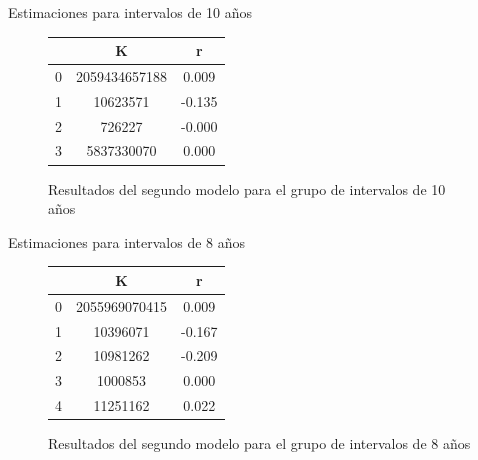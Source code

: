 \documentclass{beamer}
\begin{document}
\begin{frame}{Estimaciones para intervalos de 10 años}
    \begin{figure}[h!]%
        \begin{center}
            \begin{tabular}{|c|c|c|} \hline
                         & K 			& r 		\\ \hline
                0		 & 2059434657188& 0.009		\\ \hline
                1		 &10623571		& -0.135	\\ \hline
                2		 & 726227		& -0.000	\\ \hline
                3		 & 5837330070	& 0.000		\\ \hline
            \end{tabular}
        \caption{Resultados del segundo modelo para el grupo de intervalos de 10 años \label{fig:ex}}
        \end{center}
    \end{figure}
\end{frame} 

\begin{frame}{Estimaciones para intervalos de 8 años}
    \begin{figure}[h!]%
        \begin{center}
            \begin{tabular}{|c|c|c|} \hline
                         & K 			& r 		\\ \hline
                0		 & 2055969070415& 0.009		\\ \hline
                1		 & 10396071	    & -0.167	\\ \hline
                2		 & 10981262	    & -0.209	\\ \hline
                3		 & 1000853	    & 0.000		\\ \hline
                4		 & 11251162	    & 0.022		\\ \hline
            \end{tabular}
        \caption{Resultados del segundo modelo para el grupo de intervalos de 8 años \label{fig:ex}}
        \end{center}
    \end{figure}
\end{frame} 
\end{document}
